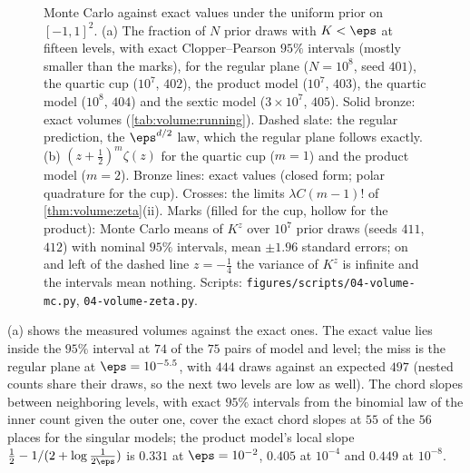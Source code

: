 \begin{refsection}
\begin{figure}[t]
\begin{fullwidth}
\end{fullwidth}
\caption{Monte Carlo against exact values under the uniform prior on $[-1,1]^2$. (a) The fraction of $N$ prior draws with $K<\eps$ at fifteen levels, with exact Clopper--Pearson $95\%$ intervals (mostly smaller than the marks), for the regular plane ($N=10^8$, seed $401$), the quartic cup ($10^7$, $402$), the product model ($10^7$, $403$), the quartic model ($10^8$, $404$) and the sextic model ($3\times10^7$, $405$). Solid bronze: exact volumes (\cref{tab:volume:running}). Dashed slate: the regular prediction, the $\eps^{d/2}$ law, which the regular plane follows exactly. (b) $(z+\frac12)^m\zeta(z)$ for the quartic cup ($m=1$) and the product model ($m=2$). Bronze lines: exact values (closed form; polar quadrature for the cup). Crosses: the limits $\lambda C(m-1)!$ of \cref{thm:volume:zeta}(ii). Marks (filled for the cup, hollow for the product): Monte Carlo means of $K^z$ over $10^7$ prior draws (seeds $411$, $412$) with nominal $95\%$ intervals, mean $\pm1.96$ standard errors; on and left of the dashed line $z=-\frac14$ the variance of $K^z$ is infinite and the intervals mean nothing. Scripts: \texttt{figures/scripts/04-volume-mc.py}, \texttt{04-volume-zeta.py}.}\label{fig:volume:mc}
\end{figure}

(a) shows the measured volumes against the exact ones. The exact value lies inside the $95\%$ interval at $74$ of the $75$ pairs of model and level; the miss is the regular plane at $\eps=10^{-5.5}$, with $444$ draws against an expected $497$ (nested counts share their draws, so the next two levels are low as well). The chord slopes between neighboring levels, with exact $95\%$ intervals from the binomial law of the inner count given the outer one, cover the exact chord slopes at $55$ of the $56$ places for the singular models; the product model's local slope $\frac12-1/(2+\log\frac1{2\eps})$ is $0.331$ at $\eps=10^{-2}$, $0.405$ at $10^{-4}$ and $0.449$ at $10^{-8}$.


\end{refsection}
